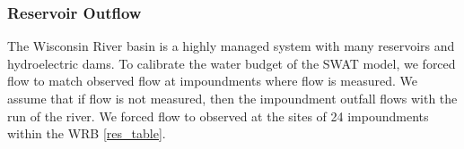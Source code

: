 \subsubsection{Reservoir Outflow}
The Wisconsin River basin is a highly managed system with many reservoirs and hydroelectric dams. To calibrate the water budget of the SWAT model, we forced flow to match observed flow at impoundments where flow is measured. We assume that if flow is not measured, then the impoundment outfall flows with the run of the river. We forced flow to observed at the sites of 24 impoundments within the WRB \ref{res_table}.



